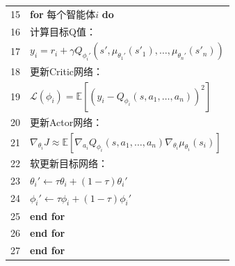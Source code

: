 \begin{table}[!ht]
\begin{tabular}{lp{}}
15 & \quad\quad \textbf{for} 每个智能体$i$ \textbf{do} \\
16 & \quad\quad\quad 计算目标Q值：\\
17 & \quad\quad\quad $y_i = r_i + \gamma Q_{\phi_i'}(s', \mu_{\theta_1'}(s'_1), \dots, \mu_{\theta_n'}(s'_n))$ \\
18 & \quad\quad\quad 更新Critic网络：\\
19 & \quad\quad\quad $\mathcal{L}(\phi_i) = \mathbb{E}[(y_i - Q_{\phi_i}(s, a_1, \dots, a_n))^2]$ \\
20 & \quad\quad\quad 更新Actor网络：\\
21 & \quad\quad\quad $\nabla_{\theta_i} J \approx \mathbb{E}[\nabla_{a_i}Q_{\phi_i}(s, a_1, \dots, a_n)\nabla_{\theta_i}\mu_{\theta_i}(s_i)]$ \\

22 & \quad\quad\quad 软更新目标网络：\\
23 & \quad\quad\quad $\theta_i' \leftarrow \tau \theta_i + (1-\tau)\theta_i'$ \\
24 & \quad\quad\quad $\phi_i' \leftarrow \tau \phi_i + (1-\tau)\phi_i'$ \\
25 & \quad\quad \textbf{end for} \\
26 & \quad \textbf{end for} \\
27 & \textbf{end for} \\
\bottomrule
\end{tabular}
\end{table}